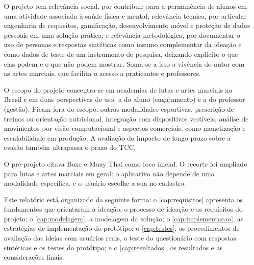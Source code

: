 O projeto tem relevância social, por contribuir para a permanência de
alunos em uma atividade associada à saúde física e mental; relevância
técnica, por articular engenharia de requisitos, gamificação,
desenvolvimento móvel e proteção de dados pessoais em uma solução
prática; e relevância metodológica, por documentar o uso de personas e
respostas sintéticas como insumo complementar da ideação e como dados de
teste de um instrumento de pesquisa, deixando explícito o que elas podem
e o que não podem mostrar. Soma-se a isso a vivência do autor
com as artes marciais, que facilita o acesso a praticantes e professores.

O escopo do projeto concentra-se em academias de lutas e artes marciais
no Brasil e em duas perspectivas de uso: a do aluno (engajamento) e a do
professor (gestão). Ficam fora do escopo: outras modalidades esportivas,
prescrição de treinos ou orientação nutricional, integração com
dispositivos vestíveis, análise de movimentos por visão computacional e
aspectos comerciais, como monetização e escalabilidade em produção. A
avaliação do impacto de longo prazo sobre a evasão também ultrapassa o
prazo do TCC.

O pré-projeto citava Boxe e Muay Thai como foco inicial. O recorte foi
ampliado para lutas e artes marciais em geral: o aplicativo não depende de
uma modalidade específica, e o usuário escolhe a sua no cadastro.

Este relatório está organizado da seguinte forma: o
\autoref{cap:requisitos} apresenta os fundamentos que orientaram a
ideação, o processo de ideação e os requisitos do projeto; o
\autoref{cap:modelagem}, a modelagem da solução; o
\autoref{cap:implementacao}, as estratégias de implementação do
protótipo; o \autoref{cap:testes}, os procedimentos de avaliação das
ideias com usuários reais, o teste do questionário com respostas
sintéticas e os testes do protótipo; e o \autoref{cap:resultados}, os resultados e as
considerações finais.

